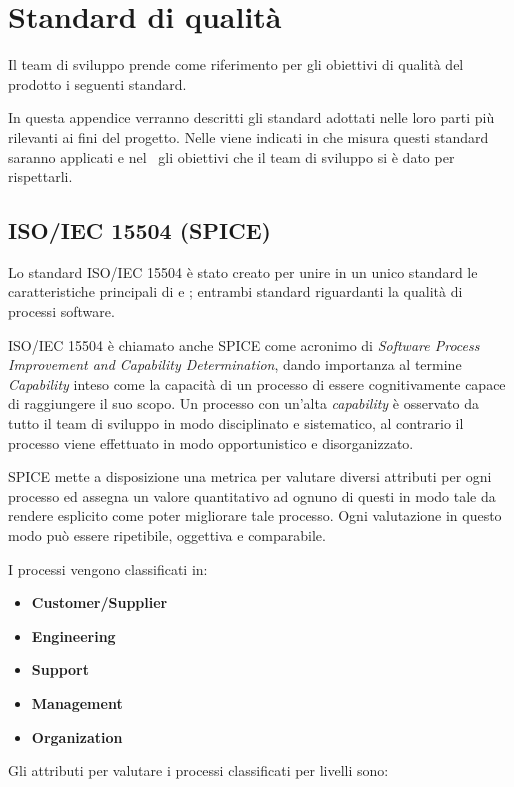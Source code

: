 \newpage
\section{Standard di qualità}
Il team di sviluppo prende come riferimento per gli obiettivi di qualità del prodotto i seguenti standard.

In questa appendice verranno descritti gli standard adottati nelle loro parti più rilevanti ai fini del progetto. Nelle \Doc{\NdP} viene indicati in che misura questi standard saranno applicati e nel \PdQ~gli obiettivi che il team di sviluppo si è dato per rispettarli.

	\subsection{ISO/IEC 15504 (SPICE)}
	Lo standard ISO/IEC 15504 è stato creato per unire in un unico standard le caratteristiche principali di  e ; entrambi standard riguardanti la qualità di processi software.
	
	ISO/IEC 15504 è chiamato anche SPICE come acronimo di \textit{Software Process Improvement and Capability Determination}, dando importanza al termine \textit{Capability} inteso come la capacità di un processo di essere cognitivamente capace di raggiungere il suo scopo. Un processo con un'alta \textit{capability} è osservato da tutto il team di sviluppo in modo disciplinato e sistematico, al contrario il processo viene effettuato in modo opportunistico e disorganizzato.
	
	SPICE mette a disposizione una metrica per valutare diversi attributi per ogni processo ed assegna un valore quantitativo ad ognuno di questi in modo tale da rendere esplicito come poter migliorare tale processo. Ogni valutazione in questo modo può essere ripetibile, oggettiva e comparabile.
	
	I processi vengono classificati in:
	
	\begin{itemize}
		\item \textbf{Customer/Supplier}
		\item \textbf{Engineering}
		\item \textbf{Support}
		\item \textbf{Management}
		\item \textbf{Organization}
	\end{itemize}
	
	Gli attributi per valutare i processi classificati per livelli sono:
	
